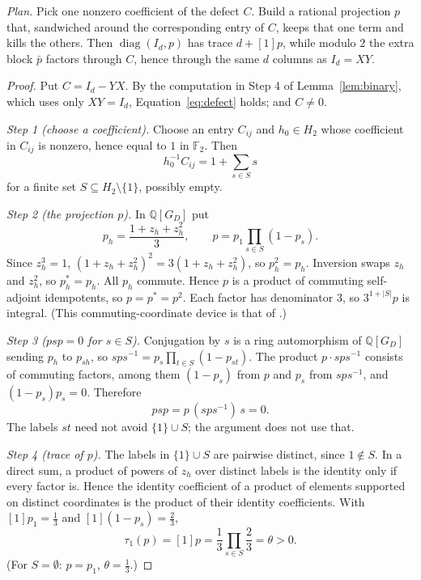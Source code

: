 \documentclass[11pt]{article}
\theoremstyle{remark}
\numberwithin{equation}{section}
\newcommand{\F}{\mathbb F}
\newcommand{\Q}{\mathbb Q}
\newcommand{\diag}{\operatorname{diag}}
\begin{document}
\emph{Plan.} Pick one nonzero coefficient of the defect $C$. Build a rational projection $p$ that, sandwiched around the corresponding entry of $C$, keeps that one term and kills the others. Then $\diag(I_d,p)$ has trace $d+[1]p$, while modulo $2$ the extra block $\bar p$ factors through $C$, hence through the same $d$ columns as $I_d=XY$.

\begin{proof}
Put $C=I_d-YX$. By the computation in Step 4 of Lemma~\ref{lem:binary}, which uses only $XY=I_d$, Equation~\eqref{eq:defect} holds; and $C\neq 0$.

\emph{Step 1 (choose a coefficient).} Choose an entry $C_{ij}$ and $h_0\in H_2$ whose coefficient in $C_{ij}$ is nonzero, hence equal to $1$ in $\F_2$. Then
\begin{equation}\label{eq:support}
 h_0^{-1}C_{ij}=1+\sum_{s\in S}s
\end{equation}
for a finite set $S\subseteq H_2\setminus\{1\}$, possibly empty.

\emph{Step 2 (the projection $p$).} In $\Q[G_D]$ put
\[
 p_h=\frac{1+z_h+z_h^2}{3},\qquad
 p=p_1\prod_{s\in S}(1-p_s).
\]
Since $z_h^3=1$, $(1+z_h+z_h^2)^2=3(1+z_h+z_h^2)$, so $p_h^2=p_h$. Inversion swaps $z_h$ and $z_h^2$, so $p_h^*=p_h$. All $p_h$ commute. Hence $p$ is a product of commuting self-adjoint idempotents, so $p=p^*=p^2$. Each factor has denominator $3$, so $3^{1+|S|}p$ is integral. (This commuting-coordinate device is that of \cite[Lemmas 3.1 and 3.4]{DicksSchick2002}.)

\emph{Step 3 ($psp=0$ for $s\in S$).} Conjugation by $s$ is a ring automorphism of $\Q[G_D]$ sending $p_h$ to $p_{sh}$, so $sps^{-1}=p_s\prod_{t\in S}(1-p_{st})$. The product $p\cdot sps^{-1}$ consists of commuting factors, among them $(1-p_s)$ from $p$ and $p_s$ from $sps^{-1}$, and $(1-p_s)p_s=0$. Therefore
\begin{equation}\label{eq:separation}
 psp=p\,(sps^{-1})\,s=0.
\end{equation}
The labels $st$ need not avoid $\{1\}\cup S$; the argument does not use that.

\emph{Step 4 (trace of $p$).} The labels in $\{1\}\cup S$ are pairwise distinct, since $1\notin S$. In a direct sum, a product of powers of $z_h$ over distinct labels is the identity only if every factor is. Hence the identity coefficient of a product of elements supported on distinct coordinates is the product of their identity coefficients. With $[1]p_1=\frac13$ and $[1](1-p_s)=\frac23$,
\begin{equation}\label{eq:theta}
 \tau_1(p)=[1]p=\frac13\prod_{s\in S}\frac23=\theta>0.
\end{equation}
(For $S=\emptyset$: $p=p_1$, $\theta=\frac13$.)


\end{proof}
\end{document}
